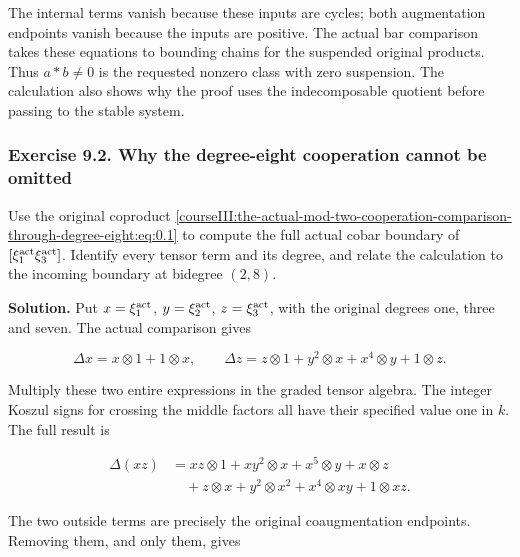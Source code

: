 The internal terms vanish because these inputs are cycles; both augmentation endpoints vanish because the inputs are positive. The actual bar comparison takes these equations to bounding chains for the suspended original products. Thus \(a\ast b\neq0\) is the requested nonzero class with zero suspension. The calculation also shows why the proof uses the indecomposable quotient before passing to the stable system.

\subsubsection{Exercise 9.2. Why the degree-eight cooperation cannot be omitted}
\label{courseIII:the-actual-mod-two-cooperation-comparison-through-degree-eight:exercise-9.2}

\label{courseIII:actual-degree8:9.2}

Use the original coproduct \eqref{courseIII:the-actual-mod-two-cooperation-comparison-through-degree-eight:eq:0.1} to compute the full actual cobar boundary of \([\xi_1^{\rm act}\xi_3^{\rm act}]\). Identify every tensor term and its degree, and relate the calculation to the incoming boundary at bidegree \((2,8)\).

\textbf{Solution.} Put \(x=\xi_1^{\rm act}\), \(y=\xi_2^{\rm act}\), \(z=\xi_3^{\rm act}\), with the original degrees one, three and seven. The actual comparison gives

\begin{equation}
\Delta x=x\otimes1+1\otimes x,
\qquad
\Delta z=z\otimes1+y^2\otimes x+x^4\otimes y+1\otimes z.
\label{courseIII:the-actual-mod-two-cooperation-comparison-through-degree-eight:eq:9.5}
\end{equation}

Multiply these two entire expressions in the graded tensor algebra. The integer Koszul signs for crossing the middle factors all have their specified value one in \(k\). The full result is

\begin{equation}
\begin{aligned}
\Delta(xz)&=xz\otimes1+xy^2\otimes x+x^5\otimes y+x\otimes z\\
 &\quad+z\otimes x+y^2\otimes x^2+x^4\otimes xy+1\otimes xz.
\end{aligned}
\label{courseIII:the-actual-mod-two-cooperation-comparison-through-degree-eight:eq:9.6}
\end{equation}

The two outside terms are precisely the original coaugmentation endpoints. Removing them, and only them, gives

